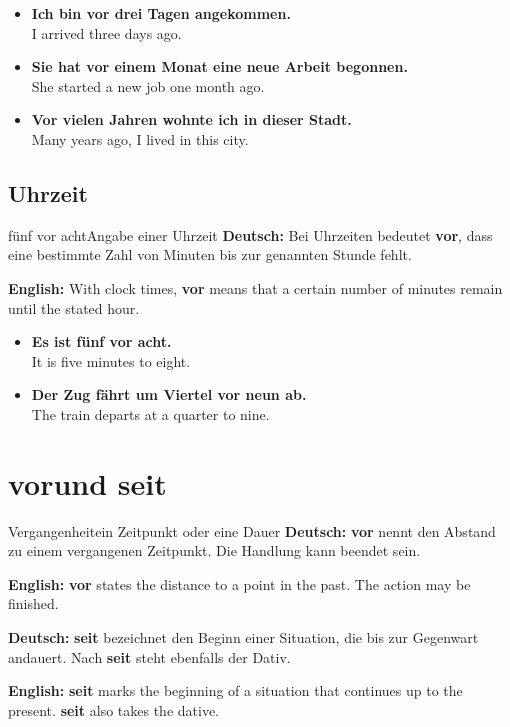 \documentclass[a4paper,11pt]{article}
\newcommand{\GermanText}[1]{\textbf{Deutsch: }#1\par}
\newcommand{\EnglishText}[1]{{\small\color{SoftGray}\textbf{English: }#1\par}}
\newcommand{\ExampleItem}[2]{\item \textbf{#1}\\{\small\color{SoftGray}#2}}
\begin{document}
            \begin{exbox}
                \begin{itemize}
                    \ExampleItem{Ich bin vor drei Tagen angekommen.}{I arrived three days ago.}
                    \ExampleItem{Sie hat vor einem Monat eine neue Arbeit begonnen.}{She started a new job one month ago.}
                    \ExampleItem{Vor vielen Jahren wohnte ich in dieser Stadt.}{Many years ago, I lived in this city.}
                \end{itemize}
            \end{exbox}

        \subsection{Uhrzeit}

            \begin{grammarentry}{fünf vor acht}{Angabe einer Uhrzeit}
                \GermanText{Bei Uhrzeiten bedeutet \textbf{vor}, dass eine bestimmte Zahl von Minuten bis zur genannten Stunde fehlt.}
                \EnglishText{With clock times, \textbf{vor} means that a certain number of minutes remain until the stated hour.}
            \end{grammarentry}

            \begin{exbox}
                \begin{itemize}
                    \ExampleItem{Es ist fünf vor acht.}{It is five minutes to eight.}
                    \ExampleItem{Der Zug fährt um Viertel vor neun ab.}{The train departs at a quarter to nine.}
                \end{itemize}
            \end{exbox}


    \section{\glqq vor\grqq und \glqq seit\grqq}

        \begin{grammarentry}{Vergangenheit}{ein Zeitpunkt oder eine Dauer}
            \GermanText{\textbf{vor} nennt den Abstand zu einem vergangenen Zeitpunkt. Die Handlung kann beendet sein.}
            \EnglishText{\textbf{vor} states the distance to a point in the past. The action may be finished.}

            \GermanText{\textbf{seit} bezeichnet den Beginn einer Situation, die bis zur Gegenwart andauert. Nach \textbf{seit} steht ebenfalls der Dativ.}
            \EnglishText{\textbf{seit} marks the beginning of a situation that continues up to the present. \textbf{seit} also takes the dative.}
        \end{grammarentry}
\end{document}
